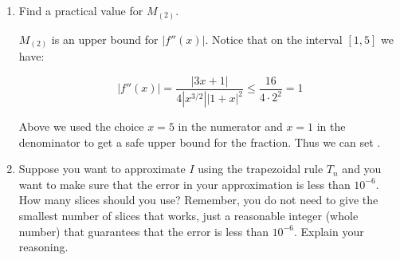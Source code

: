 \documentclass[main]{subfiles}
\begin{document}
\begin{enumerate}
\begin{enumerate}
\begin{enumerate}
\begin{solution}
        \begin{center}
\end{center}
    \end{solution}
    
\end{enumerate}
\pspace{\newpage}
    \item
    \begin{problem}[2in]
    Find a practical value for $M_{(2)}$.
    \end{problem}

    \begin{solution}
        $M_{(2)}$ is an upper bound for $|f''(x)|$. Notice that on the interval $[1,5]$ we have:

        \[|f''(x)| = \frac{|3x+1|}{4|x^{3/2}||1+x|^2} \leq \frac{16}{4 \cdot 2^2} = 1\]

        Above we used the choice $x = 5$ in the numerator and $x=1$ in the denominator to get a safe upper bound for the fraction. Thus we can set .

    \end{solution}

    \item 
    \begin{problem}[3in]
    Suppose you want to approximate $I$ using the trapezoidal rule $T_n$ and you want to make sure that the error in your approximation is less than $10^{-6}$. How many slices should you use? Remember, you do not need to give the smallest number of slices that works, just a reasonable integer (whole number) that guarantees that the error is less than $10^{-6}$. Explain your reasoning.
    \end{problem}


\end{enumerate}
\end{enumerate}
\end{document}
